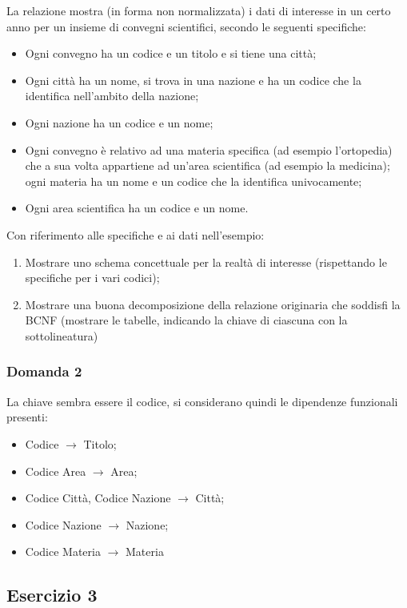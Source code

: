 \documentclass{article}
\numberwithin{equation}{subsection}
\begin{document}
La relazione mostra (in forma non normalizzata) i dati di interesse in un certo anno per un insieme di convegni
scientifici, secondo le seguenti specifiche:
\begin{itemize}
    \item Ogni convegno ha un codice e un titolo e si tiene una città;
    \item Ogni città ha un nome, si trova in una nazione e ha un codice che la identifica nell'ambito della nazione;
    \item Ogni nazione ha un codice e un nome;
    \item Ogni convegno è relativo ad una materia specifica (ad esempio l'ortopedia) che a sua volta appartiene
    ad un'area scientifica (ad esempio la medicina); ogni materia ha un nome e un codice che la identifica
    univocamente;
    \item Ogni area scientifica ha un codice e un nome. 
\end{itemize}
Con riferimento alle specifiche e ai dati nell'esempio:
\begin{enumerate}
    \item Mostrare uno schema concettuale per la realtà di interesse (rispettando le specifiche per i vari codici);
    \item Mostrare una buona decomposizione della relazione originaria che soddisfi la BCNF (mostrare le tabelle, indicando la chiave di ciascuna con la sottolineatura)
\end{enumerate}

\subsubsection*{Domanda 2}
La chiave sembra essere il codice, si considerano quindi le dipendenze funzionali presenti:
\begin{itemize}
    \item Codice $\to$ Titolo;
    \item Codice Area $\to$ Area;
    \item Codice Città, Codice Nazione $\to$ Città;
    \item Codice Nazione $\to$ Nazione;
    \item Codice Materia $\to$ Materia
\end{itemize}

\subsection{Esercizio 3}
\end{document}
